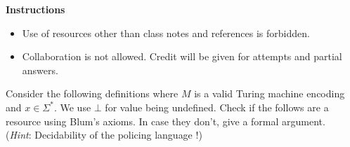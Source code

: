 \documentclass[12pt, a4paper,answers]{exam}
\begin{document}
\textbf{Instructions}
\begin{itemize}   \setlength\itemsep{0.1mm}
	\item {\sf  Use of resources other than class notes and references is forbidden.}
	\item {\sf Collaboration is not allowed. Credit will be given for attempts and partial answers.}
\end{itemize}


\begin{questions}


Consider the following definitions where $M$ is a valid Turing machine encoding and $x \in \Sigma^*$. We use $\bot$ for value being undefined. Check if the follows are a resource using Blum's axioms. In case they don't, give a formal argument. \\ (\textit{Hint}: Decidability of the policing language !)




\end{questions}
\end{document}
